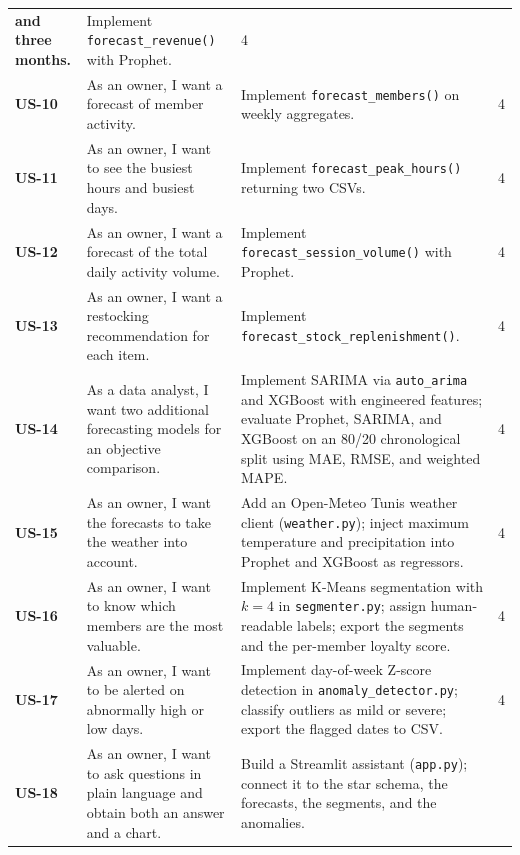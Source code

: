 \documentclass[12pt, a4paper]{report}
\begin{document}
\begin{longtable}{>{\bfseries}p{1.3cm} p{4.6cm} p{6.6cm} c}
          and three months.
        & Implement \texttt{forecast\_revenue()} with Prophet.
        & 4 \\[3pt]
  US-10 & As an owner, I want a forecast of member activity.
        & Implement \texttt{forecast\_members()} on weekly aggregates.
        & 4 \\[3pt]
  US-11 & As an owner, I want to see the busiest hours and busiest days.
        & Implement \texttt{forecast\_peak\_hours()} returning two CSVs.
        & 4 \\[3pt]
  US-12 & As an owner, I want a forecast of the total daily activity
          volume.
        & Implement \texttt{forecast\_session\_volume()} with Prophet.
        & 4 \\[3pt]
  US-13 & As an owner, I want a restocking recommendation for each item.
        & Implement \texttt{forecast\_stock\_replenishment()}.
        & 4 \\[3pt]
  US-14 & As a data analyst, I want two additional forecasting models for
          an objective comparison.
        & Implement SARIMA via \texttt{auto\_arima} and XGBoost with
          engineered features; evaluate Prophet, SARIMA, and XGBoost on
          an 80/20 chronological split using MAE, RMSE, and weighted
          MAPE.
        & 4 \\[3pt]
  US-15 & As an owner, I want the forecasts to take the weather into
          account.
        & Add an Open-Meteo Tunis weather client (\texttt{weather.py});
          inject maximum temperature and precipitation into Prophet and
          XGBoost as regressors.
        & 4 \\[3pt]
  US-16 & As an owner, I want to know which members are the most
          valuable.
        & Implement K-Means segmentation with $k=4$ in
          \texttt{segmenter.py}; assign human-readable labels; export
          the segments and the per-member loyalty score.
        & 4 \\[3pt]
  US-17 & As an owner, I want to be alerted on abnormally high or low
          days.
        & Implement day-of-week Z-score detection in
          \texttt{anomaly\_detector.py}; classify outliers as mild or
          severe; export the flagged dates to CSV.
        & 4 \\[3pt]
  US-18 & As an owner, I want to ask questions in plain language and
          obtain both an answer and a chart.
        & Build a Streamlit assistant (\texttt{app.py}); connect it to
          the star schema, the forecasts, the segments, and the
          anomalies.

\end{longtable}
\end{document}
